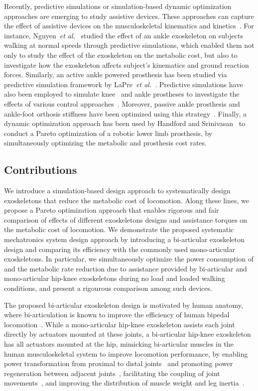 \documentclass[10pt,letterpaper]{article}
\newcommand{\etal}{\textit{et al.}}
\begin{document}
Recently, predictive simulations or simulation-based dynamic optimization approaches are emerging to study assistive devices. These approaches can capture the effect of assistive devices  on the musculoskeletal kinematics and kinetics~\cite{Dembia2019_Moco,Geijtenbeek2019}. For instance,  Nguyen~\etal~\cite{Nguyen2019} studied the effect of an ankle exoskeleton on subjects walking at  normal speeds through predictive simulations, which enabled them not only to study the effect of the exoskeleton on the metabolic cost, but also to investigate how the exoskeleton affects subject's kinematics and ground reaction forces. Similarly, an active ankle powered prosthesis has been studied via predictive simulation framework by LaPre~\etal~\cite{LaPre2014}. Predictive simulations have also been employed to simulate knee~\cite{Zhao2013} and ankle prostheses to investigate the effects of various control approaches~\cite{Handford2016}. Moreover, passive ankle prosthesis and ankle-foot orthosis stiffness have been optimized using this strategy~\cite{Sreenivasa2017,Fey2012}. Finally, a dynamic optimization approach has been used by Handford and Srinivasan~\cite{Handford2016} to conduct a Pareto optimization of a robotic lower limb prosthesis, by simultaneously optimizing the metabolic and prosthesis cost rates.

\bigskip
\subsection*{Contributions}

We introduce a simulation-based design approach to systematically design exoskeletons that reduce the metabolic cost of locomotion. Along these lines, we propose a Pareto optimization approach that enables rigorous and fair comparison of effects of different exoskeletons designs and assistance torques on the metabolic cost of locomotion. We demonstrate the proposed systematic mechatronics system design approach by introducing a bi-articular exoskeleton design and comparing its efficiency with the commonly used mono-articular exoskeletons. In particular, we simultaneously optimize the power consumption of and the metabolic rate reduction due to assistance provided by bi-articular and mono-articular hip-knee exoskeletons during no load and loaded walking conditions, and present a rigourous comparison among such devices.

The proposed bi-articular exoskeleton design is motivated by human anatomy, where bi-articulation is known to improve the efficiency of human bipedal locomotion~\cite{Junius2017}. While a mono-articular hip-knee exoskeleton assists each joint directly by actuators mounted at these joints, a bi-articular hip-knee exoskeleton has all actuators mounted at the hip, mimicking bi-articular muscles in the human musculoskeletal system to improve locomotion performance, by enabling power transformation from proximal to distal joints~\cite{Schenau1989_a,Ron1996_a} and promoting power regeneration between adjacent joints~\cite{Boris1996,Wells1988}, facilitating the coupling of joint movements~\cite{Junius2017}, and improving the distribution of muscle weight and leg inertia~\cite{Junius2017}.
\end{document}
